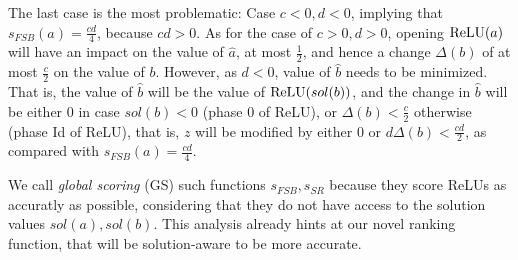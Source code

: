 The last case is the most problematic: 
Case $c<0,d<0$, implying that $s_{FSB}(a)=\frac{cd}{4}$, because $cd >0$.
As for the case of $c>0, d>0$, opening $\mathrm{ReLU}(a)$ will have an impact on the value of $\hat{a}$,
at most $\frac{1}{2}$, and hence a change $\Delta(b)$ of at most $\frac{c}{2}$ on the value of $b$.
However, as $d<0$, value of $\hat{b}$ needs to be minimized. That is, the value of $\hat{b}$ will be the value of $\mathrm{ReLU}(sol(b))$, and the change in $\hat{b}$ will be either 0 in case $sol(b)<0$ (phase 0 of ReLU),
or $\Delta(b)<\frac{c}{2}$ otherwise (phase Id of ReLU), that is, $z$ will be modified by 
either 0 or $d \Delta(b)<\frac{cd}{2}$, as compared with $s_{FSB}(a)=\frac{cd}{4}$.




We call {\em global scoring} (GS) such functions $s_{FSB},s_{SR}$  because they score ReLUs as accuratly as possible, considering that they do not have access to the solution values $sol(a),sol(b)$. This analysis already hints at our novel ranking function, that will be solution-aware to be more accurate.
	



\iffalse
\begin{figure}[t!]
\begin{tikzpicture}[scale=1, >=stealth]
	
	\draw[->] (-5,0) -- (4,0) node[right] {$b$};
	\draw[->] (0,-1) -- (0,3) node[above] {$\hat{b}$};
	
	\draw[line width=0.4mm, blue] (-3,0) -- (0,0);
	\draw[thick, blue] (0,0) -- (2.5,2.5) node[below, shift={(-1.1,-1.9)}] {$\hat{b} = \ReLU(b)$};
	\draw[thick, blue] (-3,0) -- (2.5,2.5) node[above, shift={(-6.5,-2)}] {$\hat{b} = \frac{\UB}{\UB-\LB} b-\frac{\UB\cdot\LB}{\UB-\LB}$};
	
	\draw[dashed] (2.5,0) -- (2.5,2.5) -- (0,2.5); %
	\node[below left] at (0,0) {$0$};
	
	
	\foreach \x in {2.5}
	\draw[shift={(\x,0)}] (0,0.1) -- (0,-0.1) node[below] {$\UB$};
	\foreach \x in {-3}
	\draw[shift={(\x,0)}] (0,0.1) -- (0,-0.1) node[below] {$\LB$};

	\foreach \y in {2.5}
	\draw[shift={(0,\y)}] (0.1,0) -- (-0.1,0) node[left] {$\UB$};
	
	\draw (-1,0.1) -- (-1,-0.1) node[below] {$\sol(b)$};
	\draw[dashed] (-1,0) -- (-1,0.9) -- (0,0.9);
	\draw (-0.1,0.9) -- (0.1,0.9) node[right, shift={(-0.1,0.13)}] {$\sol(\hat{b})$};
	\node at (-0.5,0.4) {$\Delta(b)$};
	
\end{tikzpicture}
	\caption{}
\label{img:Utility}
\end{figure}
\fi


